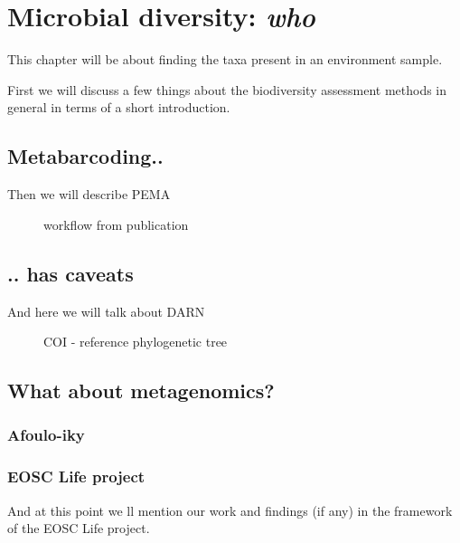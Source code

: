 
\chapter{Microbial diversity: \textit{who}}
\label{cha:2}

This chapter will be about finding the taxa present in an environment sample. 

First we will discuss a few things about the biodiversity assessment methods in general in terms of a short introduction. 

\section{Metabarcoding..}
Then we will describe PEMA


\begin{figure}{}
   \caption{workflow from publication}
\end{figure}




\section{.. has caveats}
And here we will talk about DARN


\begin{figure}{}
   \centering
   \caption{COI - reference phylogenetic tree}
\end{figure}


\section{What about metagenomics?}


   \subsection{Afoulo-iky}

   \subsection{EOSC Life project}
   And at this point we ll mention our work and 
   findings (if any) in the framework of the EOSC Life project.






